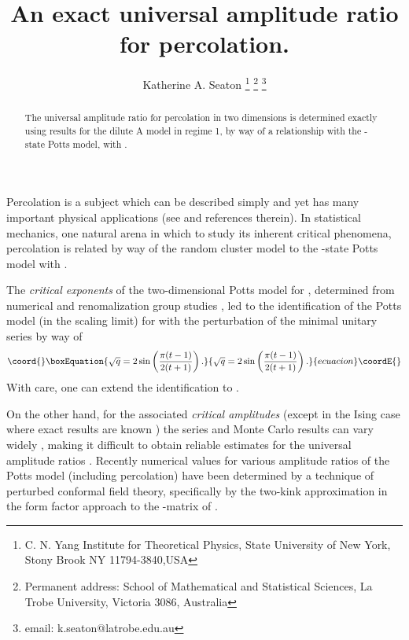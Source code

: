 \documentclass[a4paper,a4paper]{article}
\begin{document}
\title{An exact universal amplitude ratio for percolation.}
\author{Katherine A. Seaton
\thanks{
C. N. Yang Institute for
Theoretical Physics, State University of
New York, Stony Brook NY 11794-3840,USA}
\thanks{
Permanent address:
School of Mathematical and Statistical Sciences,
La Trobe University, Victoria 3086, Australia}
\thanks{email: k.seaton@latrobe.edu.au}}

\maketitle


\begin{abstract}The universal amplitude ratio \coordHE{} for
percolation in two dimensions is determined exactly
using results for the dilute A
model in regime 1, by way of a relationship with the \coordHE{}-state Potts
model, with \coordHE{}. 
\end{abstract}


Percolation is a subject which can be described simply and 
yet has many important physical applications (see \cite{SA}
and references therein). In statistical mechanics, one natural
arena in which to study its inherent critical phenomena,  
percolation is related by way of the random cluster model
\cite{FK} to  the \coordHE{}-state Potts model with \coordHE{}. 

The {\it critical exponents}
of the two-dimensional Potts model 
for \coordHE{}, determined from numerical and
renomalization group studies \cite{dn, nien},
led to the identification \cite{dot}  of  the Potts model 
(in the scaling limit) 
for \coordHE{} 
with the \coordHE{}
perturbation of the minimal unitary series \coordHE{}
by way of
\begin{equation}\coord{}\boxEquation{
\sqrt{q}=2 \sin\left(\frac{\pi(t-1)}{2(t+1)}\right). \label{qt}
}{
\sqrt{q}=2 \sin\left(\frac{\pi(t-1)}{2(t+1)}\right). }{ecuacion}\coordE{}\end{equation}
With care, one can extend the identification to \coordHE{}.


On the other hand, for the
associated {\it critical amplitudes} (except in the Ising case \coordHE{}
where exact results are known \cite{McWu}) the series and Monte Carlo
results can vary widely \cite{wu}, making it difficult to obtain
reliable estimates for the universal amplitude ratios \cite{PHA}.
Recently numerical values for 
various amplitude ratios of the Potts model (including percolation) have
been determined \cite{dc} by a technique of perturbed conformal field
theory, specifically by the two-kink approximation in the
form factor approach  to the \coordHE{}-matrix of \cite{chim}.
\end{document}
